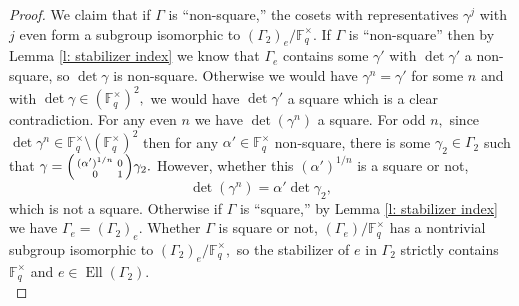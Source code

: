 \documentclass[11pt]{amsart}
\theoremstyle{definition}
\newenvironment{psmallmatrix}
{\left(\begin{smallmatrix}}
	{\end{smallmatrix}\right)}
\numberwithin{equation}{section}
\newcommand{\bbF}{\mathbb{F}}		%
\begin{document}
\begin{proof}
			We claim that if $\Gamma$ is ``non-square,'' the cosets with representatives 
			$\gamma^j$
			with $j$ even form a subgroup isomorphic to $(\Gamma_2)_e/\bbF_q^{\times}.$ 
			If $\Gamma$ is ``non-square'' then by Lemma \ref{l: stabilizer index} we know that $\Gamma_e$ contains some $\gamma'$ with $\det\gamma'$ a non-square, so $\det\gamma$ is non-square. Otherwise we would have $\gamma^n=\gamma'$ for some $n$ and with $\det\gamma\in (\bbF_q^{\times})^2,$ we would have $\det\gamma'$ a square which is a clear contradiction.
			For any even $n$ we have $\det(\gamma^n)$ a square.
			For odd $n,$ since $\det\gamma^n\in \bbF_q^{\times}\setminus(\bbF_q^{\times})^2$ then for any $\alpha'\in \bbF_q^{\times}$ non-square, there is some $\gamma_2\in \Gamma_2$ such that $\displaystyle{\gamma=\begin{psmallmatrix}(\alpha')^{1/n}&0\\0&1\end{psmallmatrix}\gamma_2}.$ However, whether this $(\alpha')^{1/n}$ is a square or not, 
			\[\det(\gamma^n)=\alpha'\det\gamma_2,\]
			which is not a square. Otherwise if $\Gamma$ is ``square,'' by Lemma \ref{l: stabilizer index} we have $\Gamma_e=(\Gamma_2)_e.$  
			Whether $\Gamma$ is square or not, $(\Gamma_e)/\bbF_q^{\times}$ has a nontrivial subgroup isomorphic to $(\Gamma_2)_e/\bbF_q^{\times},$ so the stabilizer of $e$ in $\Gamma_2$ strictly contains $\bbF_q^{\times}$ and $e\in \operatorname{Ell}(\Gamma_2).$\\
			

\end{proof}
\end{document}
